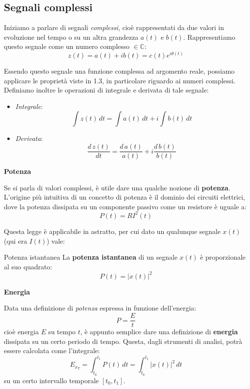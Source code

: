 \documentclass[a4paper,11pt]{article}
\begin{document}
\subsection{Segnali complessi}
Iniziamo a parlare di segnali \textit{complessi}, cioè rappresentati da due valori in evoluzione nel tempo o su un altra grandezza $a(t)$ e $b(t)$. Rappresentiamo questo segnale come un numero complesso $\in \mathbb{C}$:
$$
z(t) = a(t) + i b(t) = c(t)e^{i \theta(t)}
$$

Essendo questo segnale una funzione complessa ad argomento reale, possiamo applicare le proprietà viste in 1.3, in particolare riguardo ai numeri complessi. Definiamo inoltre le operazioni di integrale e derivata di tale segnale:
\begin{itemize}
	\item \textit{Integrale}: 
$$
\int z(t) \, dt = \int a(t) \, dt + i \int b(t) \, dt
$$
	\item \textit{Derivata}:
$$
\frac{d \, z(t)}{dt} = \frac{d \, a(t)}{a(t)} + i \frac{d \, b(t)}{b(t)}
$$
\end{itemize}

\par\smallskip

\noindent
\textbf{\textsf{Potenza}}

\noindent
Se si parla di valori complessi, è utile dare una qualche nozione di \textbf{potenza}. L'origine più intuitiva di un concetto di potenza è il dominio dei circuiti elettrici, dove la potenza dissipata su un componente passivo come un resistore è uguale a:
$$
P(t) = R I^2(t)
$$

Questa legge è applicabile in astratto, per cui dato un qualunque segnale $x(t)$ (qui era $I(t)$) vale:
\begin{definition}{Potenza istantanea}
La \textbf{potenza istantanea} di un segnale $x(t)$ è proporzionale al suo quadrato:
$$
P(t) = |x(t)|^2
$$
\end{definition}

\par\smallskip

\noindent
\textbf{\textsf{Energia}}

\noindent
Data una definizione di \textit{potenza} espressa in funzione dell'energia:
$$
P = \frac{E}{t}
$$
cioè energia $E$ su tempo $t$, è appunto semplice dare una definizione di \textbf{energia} dissipata su un certo periodo di tempo. Questa, dagli strumenti di analisi, potrà essere calcolata come l'integrale:
$$
E_{x_T} = \int_{t_0}^{t_1} P(t) \, dt = \int_{t_0}^{t_1} |x(t)|^2 \, dt
$$
su un certo intervallo temporale $[t_0, t_1]$.
\end{document}
